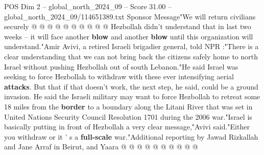 \begin{textsample}{POS Dim 2 – global\_north\_2024\_09 – Score 31.00 – global\_north\_2024\_09/114651389.txt}
Sponsor Message"We will return civilians securely @ @ @ @ @ @ @ @ @ @ Hezbollah didn't understand that in last two weeks -- it will face another \textbf{blow} and another \textbf{blow} until this organization will understand."Amir Avivi, a retired Israeli brigadier general, told NPR :"There is a clear understanding that we can not bring back the citizens safely home to north Israel without pushing Hezbollah out of south Lebanon."He said Israel was seeking to force Hezbollah to withdraw with these ever intensifying aerial \textbf{attacks}.
But that if that doesn't work, the next step, he said, could be a ground invasion.
He said the Israeli military may want to force Hezbollah to retreat some 18 miles from the \textbf{border} to a boundary along the Litani River that was set in United Nations Security Council Resolution 1701 during the 2006 war."Israel is basically putting in front of Hezbollah a very clear message,"Avivi said."Either you withdraw or it ' s a \textbf{full-scale} war."Additional reporting by Jawad Rizkallah and Jane Arraf in Beirut, and Yaara @ @ @ @ @ @ @ @ @ @

\end{textsample}
